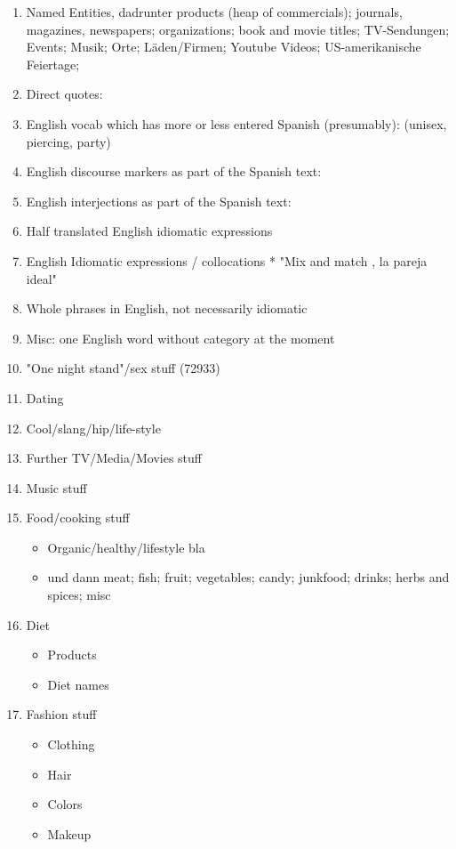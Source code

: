 \begin{enumerate}
  \item Named Entities, dadrunter products (heap of commercials); journals, magazines, newspapers; organizations; book and movie titles; TV-Sendungen; Events; Musik; Orte; Läden/Firmen; Youtube Videos; US-amerikanische Feiertage;
  \item Direct quotes:
  \item English vocab which has more or less entered Spanish (presumably): (unisex, piercing, party)
  \item English discourse markers as part of the Spanish text:
  \item English interjections as part of the Spanish text:
  \item Half translated English idiomatic expressions
  \item English Idiomatic expressions / collocations
    * "Mix and match , la pareja ideal"
  \item Whole phrases in English, not necessarily idiomatic %
  \item Misc: one English word without category at the moment
  \item "One night stand"/sex stuff (72933)
  \item Dating
  \item Cool/slang/hip/life-style
  \item Further TV/Media/Movies stuff
  \item Music stuff
  \item Food/cooking stuff
    \begin{itemize}
      \item Organic/healthy/lifestyle bla
      \item und dann meat; fish; fruit; vegetables; candy; junkfood; drinks; herbs and spices; misc
    \end{itemize}
  \item Diet
    \begin{itemize}
      \item Products
      \item Diet names
    \end{itemize}
  \item Fashion stuff
    \begin{itemize}
      \item Clothing
      \item Hair
      \item Colors
      \item Makeup

\end{itemize}
\end{enumerate}
